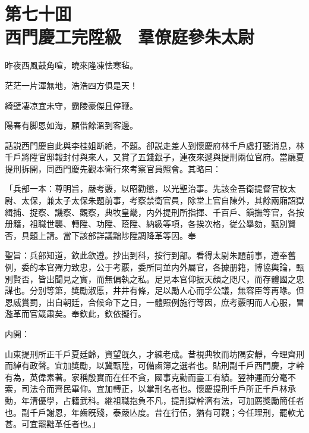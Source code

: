 
\chapter*{第七十囬　\\西門慶工完陞級　羣僚庭參朱太尉}


\begin{myquote}
昨夜西風鼓角喧，曉來隆凍怯寒毡。

茫茫一片渾無地，浩浩四方俱是天！

綺壁凄凉宜未守，霸陵豪傑且停鞭。

陽春有脚恩如海，願借餘溫到客邊。
\end{myquote}

話説西門慶自此與李桂姐断絶，不題。卻説走差人到懷慶府林千戶處打聽消息，林千戶將陞官邸報封付與來人，又賞了五錢銀子，連夜來遞與提刑兩位官府。當廳夏提刑拆開，同西門慶先觀本衛行來考察官員照會。其略曰：

\begin{myquote}[\markfont]
「兵部一本：尊明旨，嚴考覈，以昭勸懲，以光聖治事。先該金吾衛提督官校太尉、太保，兼太子太保朱題前事，考察禁衛官員，除堂上官自陳外，其餘兩廂詔獄緝捕、捉察、譏察、觀察，典牧皇畿，内外提刑所指揮、千百戶、鎭撫等官，各按册籍，祖職世襲、轉陞、功陞、蔭陞、納級等項，各挨次格，従公擧劾，甄別賢否，具題上請。當下該部詳議黜陟陞調降革等因。奉

聖旨：兵部知道，欽此欽遵。抄出到科，按行到部。看得太尉朱題前事，遵奉舊例，委的本官殫力致忠，公于考覈，委所同並内外屬官，各據册籍，博協輿論，甄別賢否，皆出聞見之實，而無偏執之私。足見本官仰扳天顔之咫尺，而存體國之忠謀也。分别等第，獎勵淑慝，井井有條，足以勵人心而孚公議，無容臣等再喙。但恩威賞罰，出自朝廷，合候命下之日，一體照例施行等因，庶考覈明而人心服，冒濫革而官箴肅矣。奉欽此，欽依擬行。

内開：

山東提刑所正千戶夏廷齡，資望旣久，才練老成。昔視典牧而坊隅安靜，今理齊刑而綽有政聲。宜加獎勵，以冀甄陞，可備鹵簿之選者也。貼刑副千戶西門慶，才幹有為，英偉素著。家稱殷實而在任不貪，國事克勤而臺工有績。翌神運而分毫不索，司法令而齊民畢仰。宜加轉正，以掌刑名者也。懷慶提刑千戶所正千戶林承勳，年清優學，占籍武科。継祖職抱負不凡，提刑獄幹濟有法，可加薦獎勵簡任者也。副千戶謝恩，年齒旣殘，泰嚴亾度。昔在行伍，猶有可觀；今任理刑，罷軟尤甚。可宜罷黜革任者也。」
\end{myquote}

